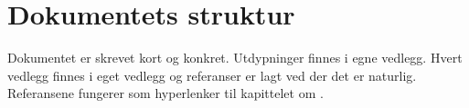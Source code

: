 \chapter{\color{Millum}Dokumentets struktur}
Dokumentet er skrevet kort og konkret. Utdypninger finnes i egne vedlegg. Hvert vedlegg finnes i eget vedlegg og referanser er lagt ved der det er naturlig. Referansene fungerer som hyperlenker til kapittelet om \textbf{}.\newline

